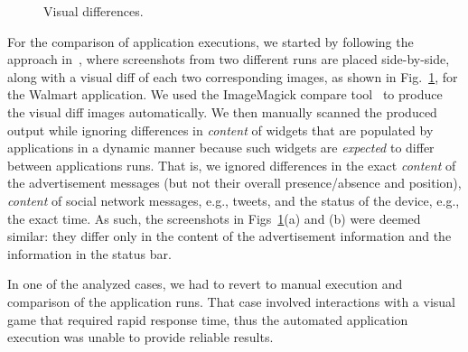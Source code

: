 \begin{figure}[!t]
{    }%
%
    \vspace{-0.1in}
    \caption{Visual differences.}
       \vspace{-0.1in}
    \label{fig:screenshots}
    \vspace{-0.1in}
\end{figure}

For the comparison of application executions, we started by following the approach in~\cite{Hornyack:Han:Jung:Schechter:Wetherall:CCS11}, where screenshots from two different runs are placed side-by-side, 
along with a visual diff of each two corresponding images, as shown in Fig.~\ref{fig:screenshots}, for 
the Walmart application. 
We used the ImageMagick compare tool~\cite{imagemagick}
to produce the visual diff images automatically. 
We then manually scanned the produced output while ignoring differences in \emph{content} of 
widgets that are populated by applications in a dynamic manner because such widgets are \emph{expected} to differ between applications runs.
That is, we ignored differences in the exact \emph{content} of the advertisement messages (but not their overall presence/absence and position), 
\emph{content} of social network messages, e.g., tweets, and the status of the device, e.g., the exact time. As such, the screenshots in Figs~\ref{fig:screenshots}(a) and (b) were deemed similar: they differ only in the content of the advertisement information and the information in the status bar.

In one of the analyzed cases, we had to revert to manual execution and comparison of the application runs.
That case involved interactions with a visual game that required rapid response time, 
thus the automated application execution was unable to provide reliable results. 


